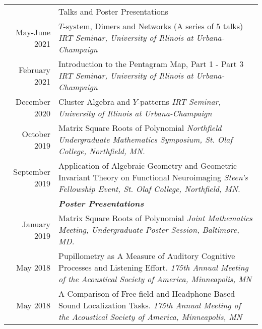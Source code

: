 \documentclass[letterpaper, 11pt]{article}
\newcommand{\headingfont}{\Large\color{Red}}
\newenvironment{SectionTable}[1]{
	\renewcommand*{\arraystretch}{1.7}
	\setlength{\tabcolsep}{10pt}
	\begin{longtable}{Rp{5.2in}} & #1 \\}
	{\end{longtable}\vspace{-.3cm}}
\begin{document}
\begin{SectionTable}{\headingfont Talks and Poster Presentations}
		May-June 2021 &
		$T$-system, Dimers and Networks (A series of 5 talks) \newline
		\textit{IRT Seminar, University of Illinois at Urbana-Champaign} \\
		

		February 2021 &
		Introduction to the Pentagram Map, Part 1 - Part 3 \newline
		\textit{IRT Seminar, University of Illinois at Urbana-Champaign} \\
		
		December 2020 &
		Cluster Algebra and $Y$-patterns \newline
		\textit{IRT Seminar, University of Illinois at Urbana-Champaign} \\
		
		
		October 2019 &
		Matrix Square Roots of Polynomial \newline
		\textit{Northfield Undergraduate Mathematics Symposium, St. Olaf College, Northfield, MN.} \\


		September 2019 &
		Application of Algebraic Geometry and Geometric Invariant Theory on Functional Neuroimaging \newline
		\textit{Steen’s Fellowship Event, St. Olaf College, Northfield, MN.} \\	


		& \textit{\textbf{Poster Presentations}}\\
		
		January 2019 &
		Matrix Square Roots of Polynomial \newline
		\textit{Joint Mathematics Meeting, Undergraduate Poster Session, Baltimore, MD.} \\
		
		May 2018 &
		Pupillometry as A Measure of Auditory Cognitive Processes and Listening Effort. \newline
		\textit{175th Annual Meeting of the Acoustical Society of America, Minneapolis, MN} \\
		
		May 2018 &
		A Comparison of Free-field and Headphone Based Sound Localization Tasks. \newline
		\textit{175th Annual Meeting of the Acoustical Society of America, Minneapolis, MN} \\
		
	\end{SectionTable}
\end{document}
